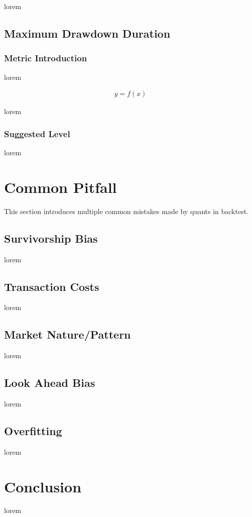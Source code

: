 \documentclass[12pt]{article}
\begin{document}
lorem

\subsection{Maximum Drawdown Duration}

\subsubsection*{Metric Introduction}

lorem

\begin{align*}
  y = f(x)
\end{align*}

lorem

\subsubsection*{Suggested Level}

lorem

\section{Common Pitfall}

This section introduces multiple common mistakes made by quants in backtest.

\subsection{Survivorship Bias}

lorem

\subsection{Transaction Costs}

lorem

\subsection{Market Nature/Pattern}

lorem

\subsection{Look Ahead Bias}

lorem

\subsection{Overfitting}

lorem

\section*{Conclusion}

lorem

\renewcommand{\refname}{Reference} %
\printbibliography
\end{document}
